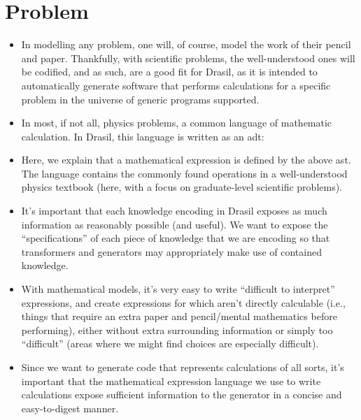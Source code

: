 
\section{Problem}

\begin{itemize}

	\item In modelling any problem, one will, of course, model the work of their
		  pencil and paper. Thankfully, with scientific problems, the
		  well-understood ones will be codified\cite{well-understood}, and as
		  such, are a good fit for Drasil, as it is intended to automatically
		  generate software that performs calculations for a specific problem in
		  the universe of generic programs supported.

	\item In most, if not all, physics problems, a common language of mathematic
	      calculation. In Drasil, this language is written as an \acf{adt}: 
		  
		  \currentExprHaskell

	\item Here, we explain that a mathematical expression is defined by the
	      above \acf{ast}. The language contains the commonly found operations
	      in a well-understood physics textbook (here, with a focus on
	      graduate-level scientific problems).

	\item It's important that each knowledge encoding in Drasil exposes as much
	      information as reasonably possible (and useful).  We want to expose the ``specifications'' of each piece
	      of knowledge that we are encoding so that transformers and generators
	      may appropriately make use of contained knowledge.

	\item With mathematical models, it's very easy to write ``difficult to
	      interpret'' expressions, and create expressions for which aren't
	      directly calculable (i.e., things that require an extra paper and
	      pencil/mental mathematics before performing), either without
	      extra surrounding information or simply too ``difficult'' (areas
	      where we might find choices are especially difficult).

	\item Since we want to generate code that represents calculations of all
	      sorts, it's important that the mathematical expression language we
	      use to write calculations expose sufficient information to the
	      generator in a concise and easy-to-digest manner.


\end{itemize}
